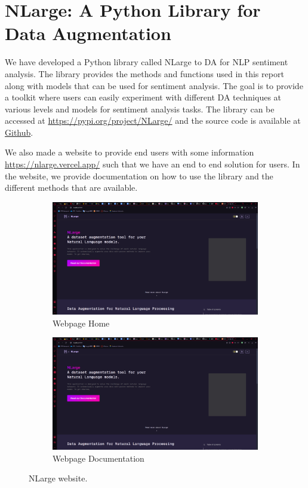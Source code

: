 \documentclass[10pt]{extarticle}
\begin{document}
\section{NLarge: A Python Library for Data Augmentation}

We have developed a Python library called NLarge to DA for NLP sentiment
analysis. The library provides the methods and functions used in this report
along with models that can be used for sentiment analysis. The goal is to
provide a toolkit where users can easily experiment with different DA
techniques at various levels and models for sentiment analysis tasks. The
library can be accessed at \url{https://pypi.org/project/NLarge/} and the
source code is available at
\href{https://github.com/dextergui/SC4001-NLarge}{Github}.

We also made a website to provide end users with some information
\url{https://nlarge.vercel.app/} such that we have an end to end solution for users. In
the website, we provide documentation on how to use the library and the
different methods that are available.

\begin{figure}[ht]
  \centering
  \begin{subfigure}[b]{0.45\textwidth}
    \includegraphics[width=\textwidth]{img/nlarge_web_1.png}
    \caption{Webpage Home}
    \label{fig:nlarge_web_1}
  \end{subfigure}
  \hfill
  \begin{subfigure}[b]{0.45\textwidth}
    \includegraphics[width=\textwidth]{img/nlarge_web_1.png}
    \caption{Webpage Documentation}
    \label{fig:nlarge_web_2}
  \end{subfigure}
  \caption{NLarge website.}
  \label{fig:nlarge_web}
\end{figure}
\end{document}
